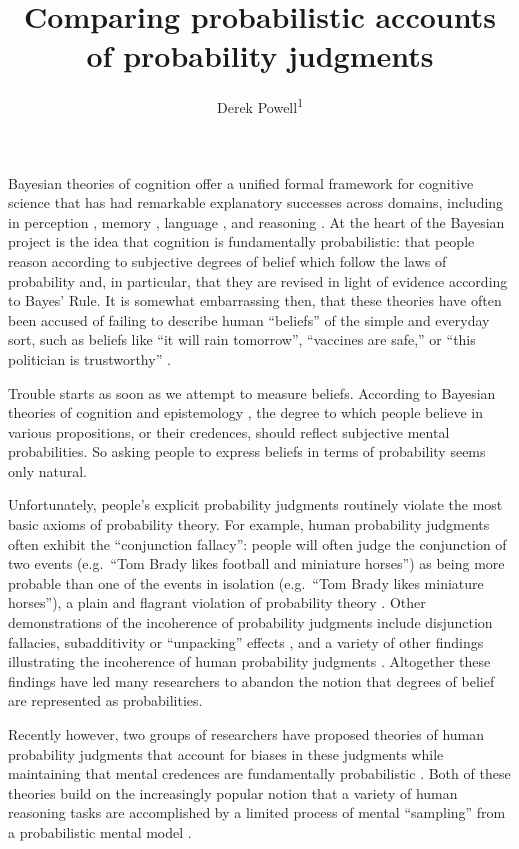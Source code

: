\documentclass[
  english,
  man,floatsintext]{apa6}
\title{Comparing probabilistic accounts of probability judgments}
\author{Derek Powell\textsuperscript{1}}
\date{}
\affiliation{\vspace{0.5cm}\textsuperscript{1} Arizona State University, School of Social and Behavioral Sciences}
\begin{document}
\maketitle

Bayesian theories of cognition offer a unified formal framework for cognitive science \autocite{tenenbaum.etal2011} that has had remarkable explanatory successes across domains, including in perception \autocite[e.g.][]{kersten.etal2004}, memory \autocite[e.g.][]{anderson1991}, language \autocite[e.g.][]{xu.tenenbaum2007}, and reasoning \autocite[e.g.][]{lu.etal2012}. At the heart of the Bayesian project is the idea that cognition is fundamentally probabilistic: that people reason according to subjective degrees of belief which follow the laws of probability and, in particular, that they are revised in light of evidence according to Bayes' Rule. It is somewhat embarrassing then, that these theories have often been accused of failing to describe human ``beliefs'' of the simple and everyday sort, such as beliefs like ``it will rain tomorrow'', ``vaccines are safe,'' or ``this politician is trustworthy'' \autocite{chater.etal2020}.

Trouble starts as soon as we attempt to measure beliefs. According to Bayesian theories of cognition and epistemology \autocite{jaynes2003}, the degree to which people believe in various propositions, or their credences, should reflect subjective mental probabilities. So asking people to express beliefs in terms of probability seems only natural.

Unfortunately, people's explicit probability judgments routinely violate the most basic axioms of probability theory. For example, human probability judgments often exhibit the ``conjunction fallacy'': people will often judge the conjunction of two events (e.g.~``Tom Brady likes football and miniature horses'') as being more probable than one of the events in isolation (e.g.~``Tom Brady likes miniature horses''), a plain and flagrant violation of probability theory \autocite{tversky.kahneman1983}. Other demonstrations of the incoherence of probability judgments include disjunction fallacies, subadditivity or ``unpacking'' effects \autocite{tversky.koehler1994}, and a variety of other findings illustrating the incoherence of human probability judgments \autocite[for an accessible review, see][]{kahneman2013}. Altogether these findings have led many researchers to abandon the notion that degrees of belief are represented as probabilities.

Recently however, two groups of researchers have proposed theories of human probability judgments that account for biases in these judgments while maintaining that mental credences are fundamentally probabilistic \autocite{costello.watts2014,zhu.etal2020}. Both of these theories build on the increasingly popular notion that a variety of human reasoning tasks are accomplished by a limited process of mental ``sampling'' from a probabilistic mental model \autocites[see also][]{chater.etal2020,dasgupta.etal2017}.
\end{document}
